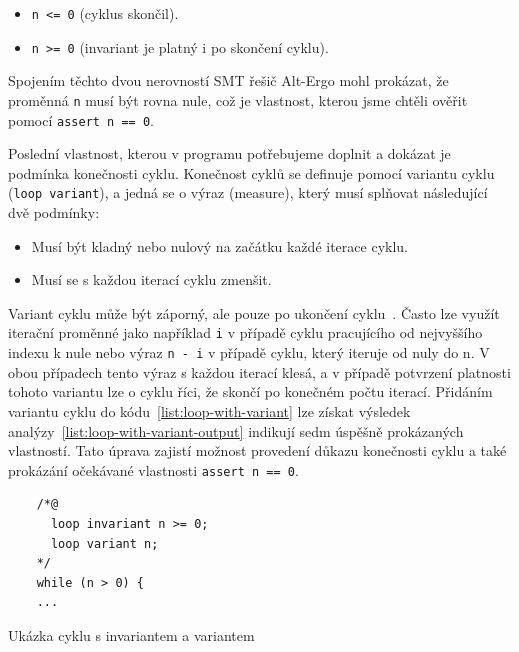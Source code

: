 \begin{itemize}
    \item \texttt{n <= 0} (cyklus skončil).
    \item \texttt{n >= 0} (invariant je platný i po skončení cyklu).
\end{itemize}

Spojením těchto dvou nerovností SMT řešič Alt-Ergo mohl prokázat,
že proměnná \texttt{n} musí být rovna nule,
což je vlastnost, kterou jsme chtěli ověřit pomocí \texttt{assert n == 0}.

Poslední vlastnost, kterou v programu potřebujeme doplnit a dokázat je podmínka konečnosti cyklu.
Konečnost cyklů se definuje pomocí variantu cyklu (\texttt{loop variant}),
a jedná se o výraz (measure), který musí splňovat následující dvě podmínky:

\begin{itemize}
    \item Musí být kladný nebo nulový na začátku každé iterace cyklu.
    \item Musí se s každou iterací cyklu zmenšit.
\end{itemize}

Variant cyklu může být záporný, ale pouze po ukončení cyklu~\cite{ACSLSpec}.
Často lze využít iterační proměnné jako například \texttt{i} v případě cyklu pracujícího od nejvyššího indexu k nule
nebo výraz \texttt{n - i} v případě cyklu, který iteruje od nuly do n.
V obou případech tento výraz s každou iterací klesá,
a v případě potvrzení platnosti tohoto variantu lze o cyklu říci,
že skončí po konečném počtu iterací.
Přidáním variantu cyklu do kódu~\ref{list:loop-with-variant}
lze získat výsledek analýzy~\ref{list:loop-with-variant-output} indikují sedm úspěšně prokázaných vlastností.
Tato úprava zajistí možnost provedení důkazu konečnosti cyklu
a také prokázání očekávané vlastnosti \texttt{assert~n~==~0}.

\begin{listing}[H]
    \begin{verbatim}
    /*@
      loop invariant n >= 0;
      loop variant n;
    */
    while (n > 0) {
    ...
    \end{verbatim}
    \caption{Ukázka cyklu s invariantem a variantem}
    \label{list:loop-with-variant}
\end{listing}

